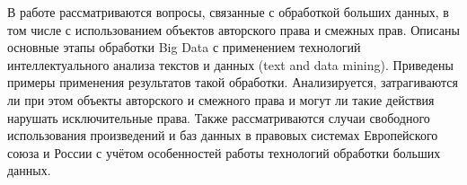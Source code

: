 \abstract

В работе рассматриваются вопросы, связанные с обработкой больших данных, в том
числе с использованием объектов авторского права и смежных прав. Описаны
основные этапы обработки Big Data с применением технологий интеллектуального
анализа текстов и данных (text and data mining). Приведены примеры применения
результатов такой обработки. Анализируется, затрагиваются ли при этом объекты
авторского и смежного права и могут ли такие действия нарушать исключительные
права. Также рассматриваются случаи свободного использования произведений и баз
данных в правовых системах Европейского союза и России с учётом особенностей
работы технологий обработки больших данных.
